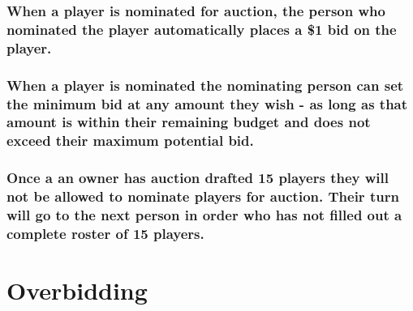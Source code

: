 \documentclass[
]{book}
\begin{document}
\hypertarget{when-a-player-is-nominated-for-auction-the-person-who-nominated-the-player-automatically-places-a-1-bid-on-the-player.}{%
\subsubsection{When a player is nominated for auction, the person who nominated the player automatically places a \$1 bid on the player.}\label{when-a-player-is-nominated-for-auction-the-person-who-nominated-the-player-automatically-places-a-1-bid-on-the-player.}}

\hypertarget{when-a-player-is-nominated-the-nominating-person-can-set-the-minimum-bid-at-any-amount-they-wish---as-long-as-that-amount-is-within-their-remaining-budget-and-does-not-exceed-their-maximum-potential-bid.}{%
\subsubsection{When a player is nominated the nominating person can set the minimum bid at any amount they wish - as long as that amount is within their remaining budget and does not exceed their maximum potential bid.}\label{when-a-player-is-nominated-the-nominating-person-can-set-the-minimum-bid-at-any-amount-they-wish---as-long-as-that-amount-is-within-their-remaining-budget-and-does-not-exceed-their-maximum-potential-bid.}}

\hypertarget{once-a-an-owner-has-auction-drafted-15-players-they-will-not-be-allowed-to-nominate-players-for-auction.-their-turn-will-go-to-the-next-person-in-order-who-has-not-filled-out-a-complete-roster-of-15-players.}{%
\subsubsection{Once a an owner has auction drafted 15 players they will not be allowed to nominate players for auction. Their turn will go to the next person in order who has not filled out a complete roster of 15 players.}\label{once-a-an-owner-has-auction-drafted-15-players-they-will-not-be-allowed-to-nominate-players-for-auction.-their-turn-will-go-to-the-next-person-in-order-who-has-not-filled-out-a-complete-roster-of-15-players.}}

\hypertarget{overbidding}{%
\section{Overbidding}\label{overbidding}}
\end{document}

